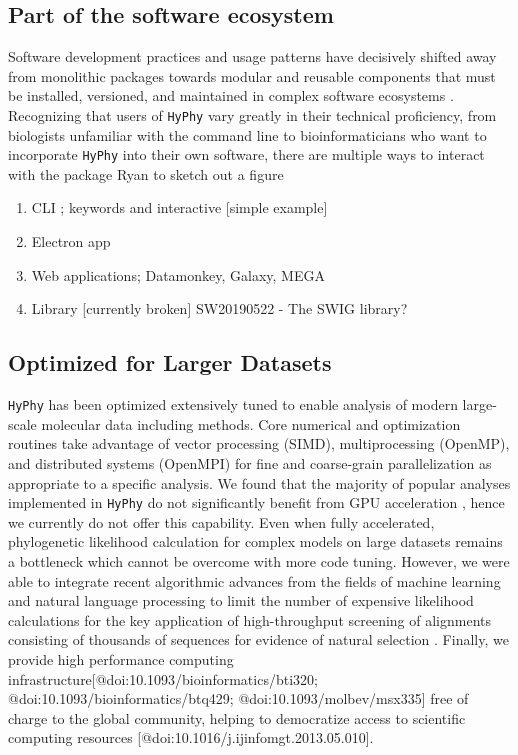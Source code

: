 \documentclass[nogrid]{MBE}%
\newcommand{\revised}[1]{{\color{red}#1}}
\newcommand{\hyphy}{{\tt HyPhy}}
\begin{document}
\subsection{Part of the software ecosystem}

Software development practices and usage patterns have decisively shifted away
from monolithic packages towards modular and reusable components that must be
installed, versioned, and maintained in complex software ecosystems \cite{xx}.
Recognizing that users of \hyphy{} vary greatly in their technical proficiency,
from biologists unfamiliar with the command line to bioinformaticians who want
to incorporate \hyphy{} into their own software, there are multiple ways to
interact with the package \revised{Ryan to sketch out a figure}

\begin{enumerate}
\item CLI ; keywords and interactive [simple example]
\item Electron app
\item Web applications; Datamonkey, Galaxy, MEGA
\item Library [currently broken] \revised{SW20190522 - The SWIG library?}
\end{enumerate}

\subsection{Optimized for Larger Datasets} 

\hyphy{} has been optimized extensively tuned to enable analysis of modern
large-scale molecular data including methods. Core numerical and optimization
routines take advantage of vector processing (SIMD), multiprocessing (OpenMP),
and distributed systems (OpenMPI) for fine and coarse-grain parallelization as
appropriate to a specific analysis. We found that the majority of popular
analyses implemented in \hyphy{} do not significantly benefit from GPU
acceleration \cite{stamatakis2019review}, hence we currently do not offer this
capability.  Even when fully accelerated, phylogenetic likelihood calculation
for complex models on large datasets remains a bottleneck which cannot be
overcome with more code tuning. However, we were able to integrate recent
algorithmic advances from the fields of machine learning and natural language
processing \cite{blei2003latent} to limit the number of expensive likelihood
calculations for the key application of high-throughput screening of alignments
consisting of thousands of sequences for evidence of natural selection
\cite{murrell2013fubar}. Finally, we provide high performance computing
infrastructure[@doi:10.1093/bioinformatics/bti320;
@doi:10.1093/bioinformatics/btq429; @doi:10.1093/molbev/msx335] free of charge
to the global community, helping to democratize access to scientific computing
resources [@doi:10.1016/j.ijinfomgt.2013.05.010].
\end{document}
